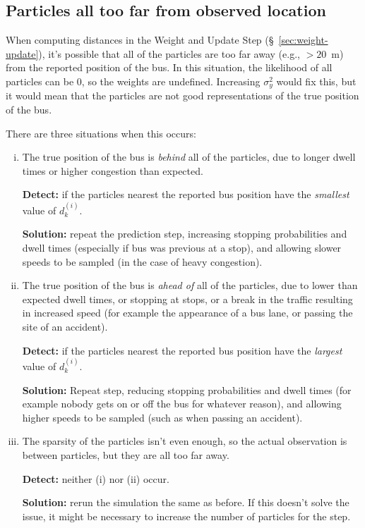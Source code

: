 \documentclass[10pt,a4paper]{article}
\begin{document}
\subsection{Particles all too far from observed location}

When computing distances in the Weight and Update Step (\S~\ref{sec:weight-update}),
it's possible that all of the particles are too far away (e.g., $>20$~m) from the 
reported position of the bus. In this situation, the likelihood of all particles
can be 0, so the weights are undefined. 
Increasing $\sigma_y^2$ would fix this, but it would mean that the particles are not 
good representations of the true position of the bus.



There are three situations when this occurs:
\begin{enumerate}[(i)]
\item 
  The true position of the bus is \emph{behind} all of the particles, due to longer dwell times
  or higher congestion than expected.

  \textbf{Detect:} if the particles nearest the reported bus position have the \emph{smallest}
  value of $d_k^{(i)}$.

  \textbf{Solution:} repeat the prediction step, increasing stopping probabilities and dwell times
  (especially if bus was previous at a stop),
  and allowing slower speeds to be sampled (in the case of heavy congestion).

\item 
  The true position of the bus is \emph{ahead of} all of the particles, due to lower than expected dwell
  times, or stopping at stops, or a break in the traffic resulting in increased speed (for example the
  appearance of a bus lane, or passing the site of an accident).

  \textbf{Detect:} if the particles nearest the reported bus position have the \emph{largest}
  value of $d_k^{(i)}$.

  \textbf{Solution:} Repeat step, reducing stopping probabilities and dwell times (for example nobody gets on or off 
  the bus for whatever reason), 
  and allowing higher speeds to be sampled (such as when passing an accident).

\item 
  The sparsity of the particles isn't even enough, so the actual observation is between particles, but they 
  are all too far away.

  \textbf{Detect:} neither (i) nor (ii) occur.

  \textbf{Solution:} rerun the simulation the same as before. If this doesn't solve the issue, it might be necessary
  to increase the number of particles for the step.
\end{enumerate}
\end{document}
